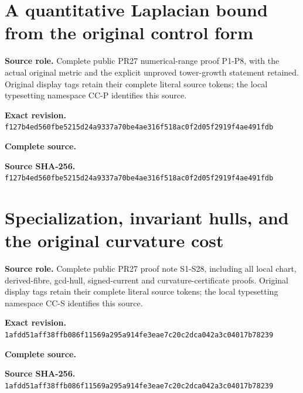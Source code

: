 \begingroup
\sloppy
\small
\makeatletter
\let\EndpointOriginalTagForm\tagform@
\def\tagform@#1{\EndpointOriginalTagForm{CC-P\, #1}}
\makeatother
\clearpage
\section{A quantitative Laplacian bound from the original control form}
\noindent\textbf{Source role.} Complete public PR27 numerical-range proof P1-P8, with the actual original metric and the explicit unproved tower-growth statement retained. Original display tags retain their complete literal source tokens; the local typesetting namespace CC-P identifies this source.\par
\noindent\textbf{Exact revision.} \nolinkurl{f127b4ed560fbe5215d24a9337a70be4ae316f518ac0f2d05f2919f4ae491fdb}\par
\noindent\textbf{Complete source.} \par
\noindent\textbf{Source SHA-256.} \nolinkurl{f127b4ed560fbe5215d24a9337a70be4ae316f518ac0f2d05f2919f4ae491fdb}\par\medskip

\endgroup

\begingroup
\sloppy
\small
\makeatletter
\let\EndpointOriginalTagForm\tagform@
\def\tagform@#1{\EndpointOriginalTagForm{CC-S\, #1}}
\makeatother
\clearpage
\section{Specialization, invariant hulls, and the original curvature cost}
\noindent\textbf{Source role.} Complete public PR27 proof note S1-S28, including all local chart, derived-fibre, gcd-hull, signed-current and curvature-certificate proofs. Original display tags retain their complete literal source tokens; the local typesetting namespace CC-S identifies this source.\par
\noindent\textbf{Exact revision.} \nolinkurl{1afdd51aff38ffb086f11569a295a914fe3eae7c20c2dca042a3c04017b78239}\par
\noindent\textbf{Complete source.} \par
\noindent\textbf{Source SHA-256.} \nolinkurl{1afdd51aff38ffb086f11569a295a914fe3eae7c20c2dca042a3c04017b78239}\par\medskip

\endgroup
